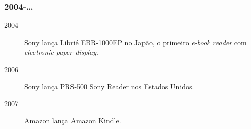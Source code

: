 \documentclass[]{beamer}
\begin{document}
\begin{frame}[fragile]
    \frametitle{2004-\ldots}
    \begin{description}
        \item[2004] Sony lan\c{c}a Libri\'{e} EBR-1000EP no Jap\~{a}o, o primeiro \textit{e-book reader} com \textit{electronic paper display}.
        \item[2006] Sony lan\c{c}a PRS-500 Sony Reader nos Estados Unidos.
        \item[2007] Amazon lan\c{c}a Amazon Kindle.
    \end{description}

    \begin{tiny}
        \begin{center}
            \begin{tabular}{p{}p{}p{}}

\end{tabular}
\end{center}
\end{tiny}
\end{frame}
\end{document}

